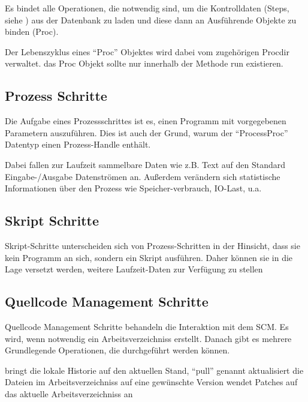 Es bindet alle Operationen, die notwendig sind,
um die Kontrolldaten (Steps, siehe )
aus der Datenbank zu laden und diese dann an Ausführende Objekte zu binden (Proc).

Der Lebenszyklus eines ``Proc'' Objektes wird dabei vom zugehörigen Procdir verwaltet.
das Proc Objekt sollte nur innerhalb der Methode run existieren.


\subsection{Prozess Schritte}

Die Aufgabe eines Prozessschrittes ist es,
einen Programm mit vorgegebenen Parametern auszuführen.
Dies ist auch der Grund, warum der ``ProcessProc'' Datentyp einen
Prozess-Handle enthält.

Dabei fallen zur Laufzeit sammelbare Daten wie z.B. Text auf den Standard Eingabe-/Ausgabe Datenströmen an.
Außerdem verändern sich statistische Informationen über den Prozess wie Speicher-verbrauch, IO-Last, u.a.


\subsection{Skript Schritte}

Skript-Schritte unterscheiden sich von Prozess-Schritten in der Hinsicht,
dass sie kein Programm an sich, sondern ein Skript ausführen.
Daher können sie in die Lage versetzt werden,
weitere Laufzeit-Daten zur Verfügung zu stellen


\subsection{Quellcode Management Schritte}

Quellcode Management Schritte behandeln die Interaktion mit dem SCM.
Es wird, wenn notwendig ein Arbeitsverzeichniss erstellt.
Danach gibt es mehrere Grundlegende Operationen, die durchgeführt werden können.

\begin{description}
        bringt die lokale Historie auf den aktuellen Stand, ``pull'' genannt
        aktualisiert die Dateien im Arbeitsverzeichniss
        auf eine gewünschte Version
        wendet Patches auf das aktuelle Arbeitsverzeichniss an
\end{description}


